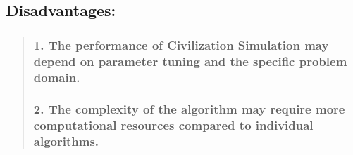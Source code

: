 \documentclass[11pt]{article}
\begin{document}
\hypertarget{disadvantages}{%
\subsection{\texorpdfstring{
Disadvantages:}{  Disadvantages:}}\label{disadvantages}}

\begin{quote}
\hypertarget{the-performance-of-civilization-simulation-may-depend-on-parameter-tuning-and-the-specific-problem-domain.}{%
\subsubsection{\texorpdfstring{ 1. The performance of Civilization
Simulation may depend on parameter tuning and the specific problem
domain.}{  1. The performance of Civilization Simulation may depend on parameter tuning and the specific problem domain.}}\label{the-performance-of-civilization-simulation-may-depend-on-parameter-tuning-and-the-specific-problem-domain.}}

\hypertarget{the-complexity-of-the-algorithm-may-require-more-computational-resources-compared-to-individual-algorithms.}{%
\subsubsection{\texorpdfstring{ 2. The complexity of the algorithm may
require more computational resources compared to individual
algorithms.}{  2. The complexity of the algorithm may require more computational resources compared to individual algorithms.}}\label{the-complexity-of-the-algorithm-may-require-more-computational-resources-compared-to-individual-algorithms.}}
\end{quote}
\end{document}
